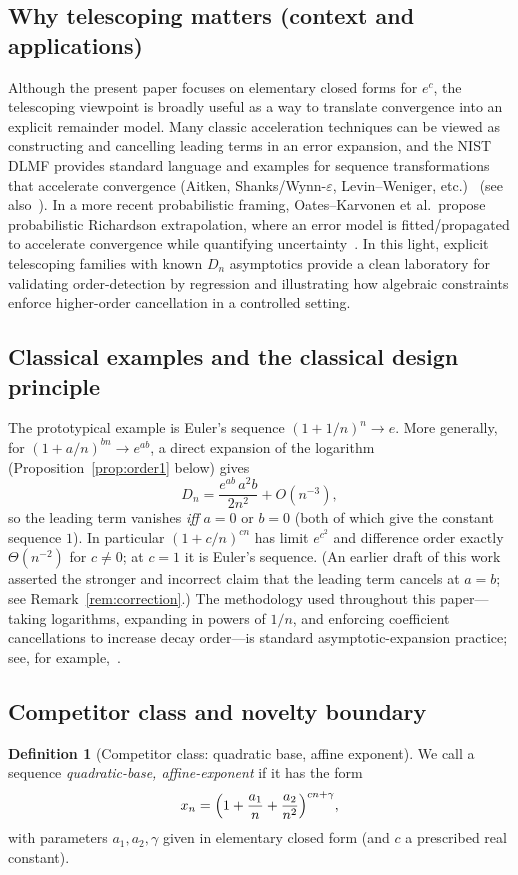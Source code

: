 \documentclass[11pt]{article}
\theoremstyle{definition}
\newtheorem{definition}[theorem]{Definition}
\begin{document}
\subsection{Why telescoping matters (context and applications)}
Although the present paper focuses on elementary closed forms for $e^{c}$, the
telescoping viewpoint is broadly useful as a way to translate convergence into an
explicit remainder model. Many classic acceleration techniques can be viewed as
constructing and cancelling leading terms in an error expansion, and the NIST DLMF
provides standard language and examples for sequence transformations that
accelerate convergence (Aitken, Shanks/Wynn-$\varepsilon$, Levin--Weniger,
etc.)~\cite{dlmf39} (see also~\cite{corless2023}). In a more recent probabilistic
framing, Oates--Karvonen et al.\ propose probabilistic Richardson extrapolation,
where an error model is fitted/propagated to accelerate convergence while
quantifying uncertainty~\cite{richardson2024,richardson2024arxiv}. In this light,
explicit telescoping families with known $D_n$ asymptotics provide a clean
laboratory for validating order-detection by regression and illustrating how
algebraic constraints enforce higher-order cancellation in a controlled setting.

\subsection{Classical examples and the classical design principle}
The prototypical example is Euler's sequence $(1+1/n)^n\to e$. More generally,
for $(1+a/n)^{bn}\to e^{ab}$, a direct expansion of the logarithm
(Proposition~\ref{prop:order1} below) gives
\begin{equation}\label{eq:classical}
  D_n = \frac{e^{ab}\,a^2 b}{2n^2} + O(n^{-3}),
\end{equation}
so the leading term vanishes \emph{iff} $a=0$ or $b=0$ (both of which give the
constant sequence $1$). In particular $(1+c/n)^{cn}$ has limit $e^{c^2}$ and
difference order exactly $\Theta(n^{-2})$ for $c\neq0$; at $c=1$ it is Euler's
sequence. (An earlier draft of this work asserted the stronger and incorrect
claim that the leading term cancels at $a=b$; see
Remark~\ref{rem:correction}.) The methodology used throughout this
paper---taking logarithms, expanding in powers of $1/n$, and enforcing coefficient
cancellations to increase decay order---is standard asymptotic-expansion practice;
see, for example,~\cite{flajolet}.

\subsection{Competitor class and novelty boundary}
\begin{definition}[Competitor class: quadratic base, affine exponent]\label{def:comp}
We call a sequence \emph{quadratic-base, affine-exponent} if it has the form
\[
  x_n = \Bigl(1 + \frac{a_1}{n} + \frac{a_2}{n^2}\Bigr)^{cn+\gamma},
\]
with parameters $a_1,a_2,\gamma$ given in elementary closed form (and $c$ a
prescribed real constant).
\end{definition}
\end{document}
